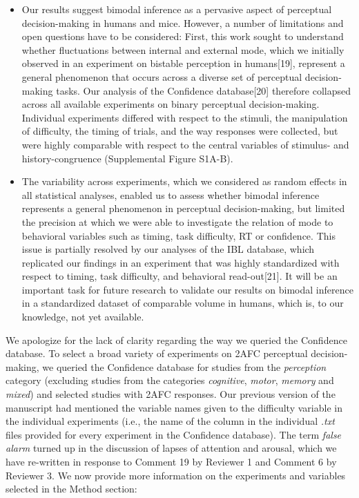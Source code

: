 \documentclass[
]{article}
\begin{document}
\begin{itemize}
\item
  Our results suggest bimodal inference as a pervasive aspect of
  perceptual decision-making in humans and mice. However, a number of
  limitations and open questions have to be considered: First, this work
  sought to understand whether fluctuations between internal and
  external mode, which we initially observed in an experiment on
  bistable perception in humans{[}19{]}, represent a general phenomenon
  that occurs across a diverse set of perceptual decision-making tasks.
  Our analysis of the Confidence database{[}20{]} therefore collapsed
  across all available experiments on binary perceptual decision-making.
  Individual experiments differed with respect to the stimuli, the
  manipulation of difficulty, the timing of trials, and the way
  responses were collected, but were highly comparable with respect to
  the central variables of stimulus- and history-congruence
  (Supplemental Figure S1A-B).
\item
  The variability across experiments, which we considered as random
  effects in all statistical analyses, enabled us to assess whether
  bimodal inference represents a general phenomenon in perceptual
  decision-making, but limited the precision at which we were able to
  investigate the relation of mode to behavioral variables such as
  timing, task difficulty, RT or confidence. This issue is partially
  resolved by our analyses of the IBL database, which replicated our
  findings in an experiment that was highly standardized with respect to
  timing, task difficulty, and behavioral read-out{[}21{]}. It will be
  an important task for future research to validate our results on
  bimodal inference in a standardized dataset of comparable volume in
  humans, which is, to our knowledge, not yet available.
\end{itemize}

We apologize for the lack of clarity regarding the way we queried the
Confidence database. To select a broad variety of experiments on 2AFC
perceptual decision-making, we queried the Confidence database for
studies from the \emph{perception} category (excluding studies from the
categories \emph{cognitive}, \emph{motor}, \emph{memory} and
\emph{mixed}) and selected studies with 2AFC responses. Our previous
version of the manuscript had mentioned the variable names given to the
difficulty variable in the individual experiments (i.e., the name of the
column in the individual \emph{.txt} files provided for every experiment
in the Confidence database). The term \emph{false alarm} turned up in
the discussion of lapses of attention and arousal, which we have
re-written in response to Comment 19 by Reviewer 1 and Comment 6 by
Reviewer 3. We now provide more information on the experiments and
variables selected in the Method section:
\end{document}
